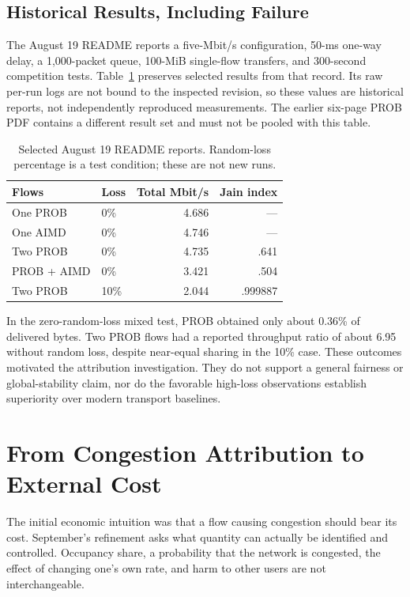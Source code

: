 \documentclass[conference,letterpaper]{IEEEtran}
\begin{document}
\subsection{Historical Results, Including Failure}
The August 19 README reports a five-Mbit/s configuration, 50-ms one-way delay, a 1,000-packet queue, 100-MiB single-flow transfers, and 300-second competition tests. Table~\ref{tab:prob} preserves selected results from that record. Its raw per-run logs are not bound to the inspected revision, so these values are historical reports, not independently reproduced measurements. The earlier six-page PROB PDF contains a different result set and must not be pooled with this table.

\begin{table}[t]
\caption{Selected August 19 README reports. Random-loss percentage is a test condition; these are not new runs.}
\label{tab:prob}
\centering\small
\begin{tabular}{llrr}
\toprule
Flows & Loss & Total Mbit/s & Jain index\\\midrule
One PROB & 0\% & 4.686 & ---\\
One AIMD & 0\% & 4.746 & ---\\
Two PROB & 0\% & 4.735 & .641\\
PROB + AIMD & 0\% & 3.421 & .504\\
Two PROB & 10\% & 2.044 & .999887\\\bottomrule
\end{tabular}
\end{table}

In the zero-random-loss mixed test, PROB obtained only about 0.36\% of delivered bytes. Two PROB flows had a reported throughput ratio of about 6.95 without random loss, despite near-equal sharing in the 10\% case. These outcomes motivated the attribution investigation. They do not support a general fairness or global-stability claim, nor do the favorable high-loss observations establish superiority over modern transport baselines.

\section{From Congestion Attribution to External Cost}
The initial economic intuition was that a flow causing congestion should bear its cost. September's refinement asks what quantity can actually be identified and controlled. Occupancy share, a probability that the network is congested, the effect of changing one's own rate, and harm to other users are not interchangeable.
\end{document}
